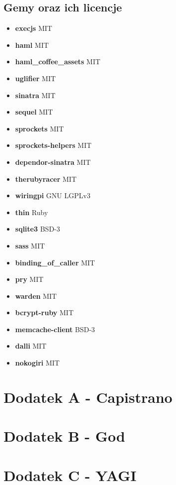 \documentclass[11pt,a4paper, twoside]{article}
\begin{document}
\subsection{Gemy oraz ich licencje}
\begin{itemize}
\item \textbf{execjs}  MIT
\item \textbf{haml} MIT
\item \textbf{haml\_coffee\_assets} MIT
\item \textbf{uglifier} MIT
\item \textbf{sinatra} MIT
\item \textbf{sequel} MIT
\item \textbf{sprockets} MIT
\item \textbf{sprockets-helpers} MIT
\item \textbf{dependor-sinatra} MIT
\item \textbf{therubyracer} MIT
\item \textbf{wiringpi} GNU LGPLv3
\item \textbf{thin} Ruby
\item \textbf{sqlite3} BSD-3
\item \textbf{sass} MIT
\item \textbf{binding\_of\_caller} MIT
\item \textbf{pry} MIT
\item \textbf{warden} MIT
\item \textbf{bcrypt-ruby} MIT
\item \textbf{memcache-client} BSD-3
\item \textbf{dalli} MIT
\item \textbf{nokogiri} MIT
\end{itemize}
\section{Dodatek A - Capistrano}
\section{Dodatek B - God}
\section{Dodatek C - YAGI}
\end{document}
